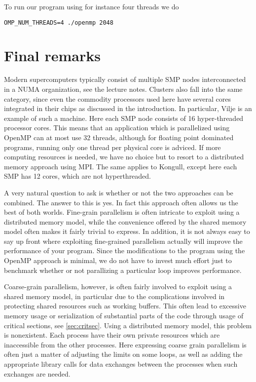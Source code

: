 To run our program using for instance four threads we do
\begin{lstlisting}[style=c]
  OMP_NUM_THREADS=4 ./openmp 2048
\end{lstlisting}

\section{Final remarks}

Modern supercomputers typically consist of multiple SMP nodes interconnected in
a NUMA organization, see the lecture notes. Clusters also fall into the same
category, since even the commodity processors used here have several cores
integrated in their chips as discussed in the introduction. In particular, Vilje
is an example of such a machine. Here each SMP node consists of 16
hyper-threaded processor cores. This means that an application which is
parallelized using OpenMP can at most use 32 threads, although for floating
point dominated programs, running only one thread per physical core is adviced.
If more computing resources is needed, we have no choice but to resort to a
distributed memory approach using MPI. The same applies to Kongull, except here
each SMP has 12 cores, which are not hyperthreaded.

A very natural question to ask is whether or not the two approaches can be
combined. The answer to this is yes. In fact this approach often allows us the
best of both worlds. Fine-grain parallelism is often intricate to exploit using
a distributed memory model, while the convenience offered by the shared memory
model often makes it fairly trivial to express. In addition, it is not always
easy to say up front where exploiting fine-grained parallelism actually will
improve the performance of your program. Since the modifications to the program
using the OpenMP approach is minimal, we do not have to invest much effort just
to benchmark whether or not parallizing a particular loop improves performance.

Coarse-grain parallelism, however, is often fairly involved to exploit using a
shared memory model, in particular due to the complications involved in
protecting shared resources such as working buffers. This often lead to
excessive memory usage or serialization of substantial parts of the code through
usage of critical sections, see \autoref{sec:critsec}. Using a distributed
memory model, this problem is nonexistent. Each process have their own private
resources which are inaccessible from the other processes. Here expressing
coarse grain parallelism is often just a matter of adjusting the limits on some
loops, as well as adding the appropriate library calls for data exchanges
between the processes when such exchanges are needed.

